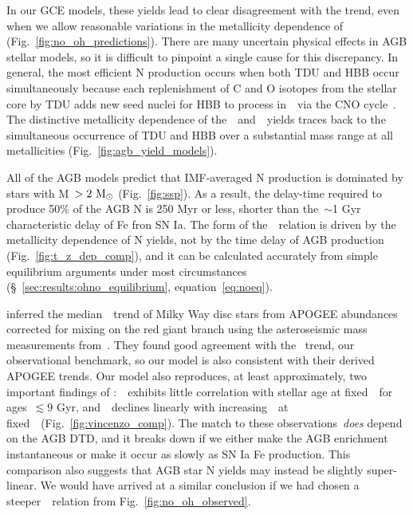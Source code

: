 \documentclass[ms.tex]{subfiles}
\begin{document}
In our GCE models, these yields lead to clear disagreement with the
\citet{Dopita2016} trend, even when we allow reasonable variations in the
metallicity dependence of~ (Fig.~\ref{fig:no_oh_predictions}).
There are many uncertain physical effects in AGB stellar models, so it is
difficult to pinpoint a single cause for this discrepancy.
In general, the most efficient N production occurs when both TDU and HBB occur
simultaneously because each replenishment of C and O isotopes from the stellar
core by TDU adds new seed nuclei for HBB to process in~\Nfourteen~via the CNO
cycle~\citep{Ventura2013}.
The distinctive metallicity dependence of the~\karakasten~and~\karakas~yields
traces back to the simultaneous occurrence of TDU and HBB over a substantial
mass range at all metallicities (Fig.~\ref{fig:agb_yield_models}).
\par
All of the AGB models predict that IMF-averaged N production is dominated by
stars with M~$> 2~\text{M}_\odot$ (Fig.~\ref{fig:ssp}).
As a result, the delay-time required to produce 50\% of the AGB N is 250 Myr or
less, shorter than the~$\sim$1 Gyr characteristic delay of Fe fron SN Ia.
The form of the~\ohno~relation is driven by the metallicity dependence of N
yields, not by the time delay of AGB production (Fig.~\ref{fig:t_z_dep_comp}),
and it can be calculated accurately from simple equilibrium arguments under
most circumstances (\S~\ref{sec:results:ohno_equilibrium},
equation~\ref{eq:noeq}).
\par
\citet{Vincenzo2021} inferred the median~\ohno~trend of Milky Way disc stars
from APOGEE abundances corrected for mixing on the red giant branch using the
asteroseismic mass measurements from~\citet{Miglio2021}.
They found good agreement with the~\citet{Dopita2016} trend, our observational
benchmark, so our model is also consistent with their derived APOGEE trends.
Our model also reproduces, at least approximately, two important findings of
\citet{Vincenzo2021}:~\no~exhibits little correlation with stellar age at
fixed~\feh~for ages~$\lesssim 9$ Gyr, and~\no~declines linearly with
increasing~\ofe~at fixed~\oh~(Fig.~\ref{fig:vincenzo_comp}).
The match to these observations~\textit{does} depend on the AGB DTD, and it
breaks down if we either make the AGB enrichment instantaneous or make it occur
as slowly as SN Ia Fe production.
{\color{red} This comparison also suggests that AGB star N yields may instead
be slightly super-linear.
We would have arrived at a similar conclusion if we had chosen a
steeper~\ohno~relation from Fig.~\ref{fig:no_oh_observed}.
}
\end{document}
